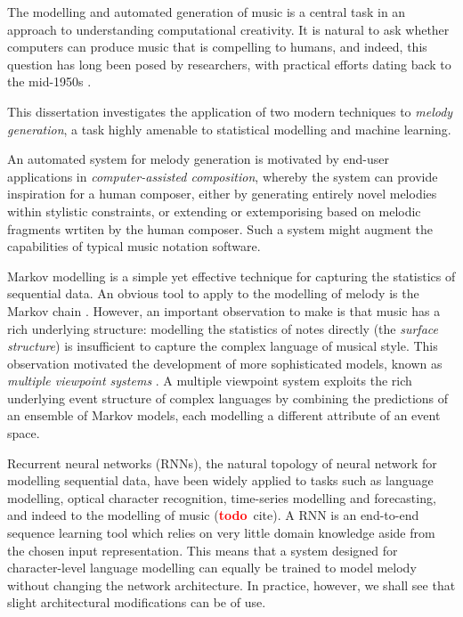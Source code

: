 \documentclass[12pt,a4paper,twoside,openright]{report}
\newcommand{\todo}{\textcolor{red}{\textbf{todo}~}}
\begin{document}
The modelling and automated generation of music is a central task in an approach
to understanding computational creativity. It is natural to ask whether
computers can produce music that is compelling to humans, and indeed, this
question has long been posed by researchers, with practical efforts dating back
to the mid-1950s \cite{ames1987automated}. 

This dissertation investigates the application of two modern techniques to
\emph{melody generation}, a task highly amenable to statistical
modelling and machine learning. 

An automated system for melody generation is motivated by end-user applications
in \emph{computer-assisted composition}, whereby the system can provide
inspiration for a human composer, either by generating entirely novel melodies
within stylistic constraints, or extending or extemporising based on melodic
fragments wrtiten by the human composer. Such a system might augment the
capabilities of typical music notation software. 

Markov modelling is a simple yet effective technique for capturing the
statistics of sequential data. An obvious tool to apply to the modelling of
melody is the Markov chain \cite{ames1989markov}. However, an important
observation to make is that music has a rich underlying structure: modelling the
statistics of notes directly (the \emph{surface structure}) is insufficient to
capture the complex language of musical style. This observation motivated the
development of more sophisticated models, known as \emph{multiple viewpoint
systems} \cite{conklin1995viewpoints}.  A multiple viewpoint system exploits the
rich underlying event structure of complex languages by combining the
predictions of an ensemble of Markov models, each modelling a different
attribute of an event space.

Recurrent neural networks (RNNs), the natural topology of neural network for
modelling sequential data, have been widely applied to tasks such as language
modelling, optical character recognition, time-series modelling and forecasting,
and indeed to the modelling of music (\todo cite). A RNN is an end-to-end
sequence learning tool which relies on very little domain knowledge aside from
the chosen input representation. This means that a system designed for
character-level language modelling can equally be trained to model melody
without changing the network architecture. In practice, however, we shall see
that slight architectural modifications can be of use.
\end{document}
